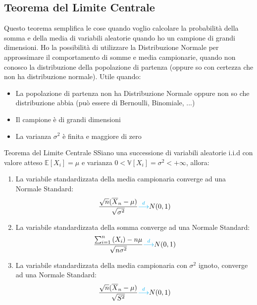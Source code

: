 \documentclass{article}  %
\theoremstyle{definition}
\begin{document}
\subsection{Teorema del Limite Centrale}
Questo teorema semplifica le cose quando voglio calcolare la probabilità della somma e della media di variabili aleatorie quando ho un campione di grandi dimensioni. Ho la possibilità
di utilizzare la Distribuzione Normale per approssimare il comportamento di somme e media campionarie, quando non conosco la distribuzione della popolazione di partenza (oppure so con
certezza che non ha distribuzione normale).
Utile quando:
\begin{itemize}
	\item La popolazione di partenza non ha Distribuzione Normale oppure non so che distribuzione abbia (può essere di Bernoulli, Binomiale, ...)
	\item Il campione è di grandi dimensioni
	\item La varianza $\sigma^2$ è finita e maggiore di zero
\end{itemize}
\begin{theorem}{Teorema del Limite Centrale}
	SSiano una successione di variabili aleatorie i.i.d con valore atteso $\mathbb{E}[X_i]=\mu$ e varianza $0<\mathbb{V}[X_i]=\sigma^2 < + \infty$, allora:
	\begin{enumerate}
		\item La variabile standardizzata della media campionaria converge ad una Normale Standard:
		      \begin{align*}
			      \frac{\sqrt{n}(\overline{X}_n - \mu)}{\sqrt{\sigma^2}} \textcolor{cyan}{\overset{d}{\longrightarrow}} N(0,1)
		      \end{align*}
		\item La variabile standardizzata della somma converge ad una Normale Standard:
		      \begin{align*}
			      \frac{\sum^{n}_{i=1} \left(X_i\right) - n \mu}{\sqrt{n\sigma^2}} \textcolor{cyan}{\overset{d}{\longrightarrow}} N(0,1)
		      \end{align*}
		\item La variabile standardizzata della media campionaria con $\sigma^2$ ignoto, converge ad una Normale Standard:
		      \begin{align*}
			      \frac{\sqrt{n}(\overline{X}_n - \mu)}{\sqrt{S^2}} \textcolor{cyan}{\overset{d}{\longrightarrow}} N(0,1)
		      \end{align*}
	\end{enumerate}
\end{theorem}
\end{document}
